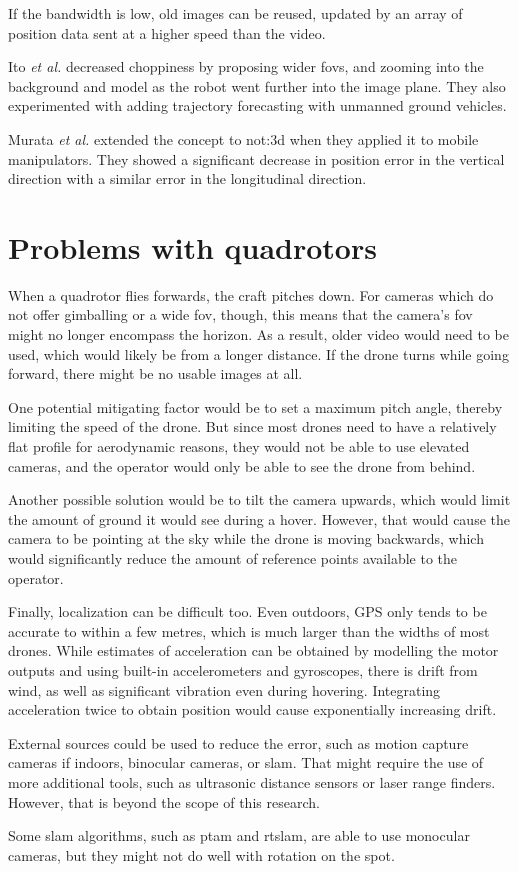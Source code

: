 If the bandwidth is low, old images can be reused, updated by an array of position data sent at a higher speed than the video.

Ito \emph{et al.} decreased choppiness by proposing wider \glspl{fov}, and zooming into the background and model as the robot went further into the image plane.\cite{ito2008}
They also experimented with adding trajectory forecasting with unmanned ground vehicles.

Murata \emph{et al.} extended the concept to \gls{not:3d} when they applied it to mobile manipulators.\cite{murata2014}
They showed a significant decrease in position error in the vertical direction with a similar error in the longitudinal direction.

\section{Problems with quadrotors}
When a quadrotor flies forwards, the craft pitches down.
For cameras which do not offer gimballing or a wide \gls{fov}, though, this means that the camera's \gls{fov} might no longer encompass the horizon.
As a result, older video would need to be used, which would likely be from a longer distance.
If the drone turns while going forward, there might be no usable images at all.

One potential mitigating factor would be to set a maximum pitch angle, thereby limiting the speed of the drone.
But since most drones need to have a relatively flat profile for aerodynamic reasons, they would not be able to use elevated cameras, and the operator would only be able to see the drone from behind.

Another possible solution would be to tilt the camera upwards, which would limit the amount of ground it would see during a hover.
However, that would cause the camera to be pointing at the sky while the drone is moving backwards, which would significantly reduce the amount of reference points available to the operator.

Finally, localization can be difficult too.
Even outdoors, GPS only tends to be accurate to within a few metres, which is much larger than the widths of most drones.
While estimates of acceleration can be obtained by modelling the motor outputs and using built-in accelerometers and gyroscopes, there is drift from wind, as well as significant vibration even during hovering.
Integrating acceleration twice to obtain position would cause exponentially increasing drift.

External sources could be used to reduce the error, such as motion capture cameras if indoors, binocular cameras, or \gls{slam}.
That might require the use of more additional tools, such as ultrasonic distance sensors or laser range finders.
However, that is beyond the scope of this research.

Some \gls{slam} algorithms, such as \gls{ptam} and \gls{rtslam}, are able to use monocular cameras, but they might not do well with rotation on the spot.
